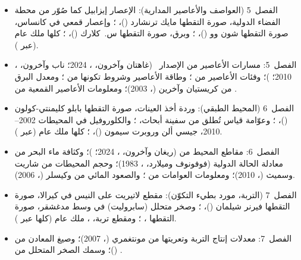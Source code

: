 \begin{itemize}
  \item الفصل~5 (العواصف والأعاصير المدارية): الإعصار إيزابيل كما صُوّر من محطة الفضاء الدولية، صورة التقطها مايك ترنشارد ()، ؛ وإعصار قمعي في كانساس، صورة التقطها شون وو ()، ؛ وبرق، صورة التقطها س.~كلارك ()، ؛ كلها ملك عام (عبر ).
  \item الفصل~5: مسارات الأعاصير من  الإصدار~ (غاهتان وآخرون، ، 2024؛ ناب وآخرون، ، 2010؛ )؛ وفئات الأعاصير من ؛ وطاقة الأعاصير وشروط تكونها من ؛ ومعدل البرق من كريستيان وآخرين (، 2003)؛ ومعلومات الأعاصير القمعية من .
  \item الفصل~6 (المحيط الطبقي): وردة أخذ العينات، صورة التقطها بابلو كليمنتي-كولون ()، ؛ وعوّامة قياس تُطلق من سفينة أبحاث، ؛ والكلوروفيل في المحيطات 2002--2010، جيسي ألن وروبرت سيمون ()، ؛ كلها ملك عام (عبر ).
  \item الفصل~6: مقاطع المحيط من  (ريغان وآخرون، ، 2024؛ )؛ وكثافة ماء البحر من معادلة الحالة الدولية (فوفونوف وميلارد، ، 1983)؛ وحجم المحيطات من شاريت وسميث (، 2010)؛ ومعلومات العوامات من ؛ والصعود المائي من  وكيسلر (، 2006).
  \item الفصل~7 (التربة، مورد بطيء التكوّن): مقطع لاتيريت على النيس في كيرالا، صورة التقطها فيرنر شيلمان ()، ؛ وصخر متحلل (سابروليت) في وسط مدغشقر، صورة التقطها ، ؛ ومقطع تربة، ، ملك عام (كلها عبر ).
  \item الفصل~7: معدلات إنتاج التربة وتعريتها من مونتغمري (، 2007)؛ وصيغ المعادن من  ()؛ وسمك الصخر المتحلل من .

\end{itemize}
